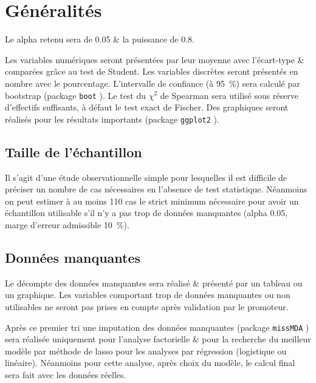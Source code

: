 \documentclass[
  a4paper,
  french]{scrreprt}
\renewcommand*\contentsname{Table des matières}
\newcommand\contentsname{Table des matières}
\begin{document}
\renewcommand*\contentsname{Table des matières}
{
\hypersetup{linkcolor=}
\setcounter{tocdepth}{2}
\tableofcontents
}
\chapter{Généralités}\label{guxe9nuxe9ralituxe9s}

Le \gls{alpha} retenu sera de \num{0.05} \& la \gls{puissance} de
\num{0.8}.

Les variables numériques seront présentées par leur moyenne avec
l'écart-type \& comparées grâce au test de Student. Les variables
discrètes seront présentés en nombre avec le pourcentage. L'intervalle
de confiance (à \qty{95}{\percent}) sera calculé par \gls{bootstrap}
(package \texttt{boot} \autocite{boot}). Le test du \(\chi^2\) de
Spearman sera utilisé sous réserve d'effectifs suffisants, à défaut le
test exact de Fischer. Des graphiques seront réalisés pour les résultats
importants (package \texttt{ggplot2} \autocite{ggplot}).

\section{Taille de l'échantillon}\label{taille-de-luxe9chantillon}

Il s'agit d'une étude observationnelle simple pour lesquelles il est
difficile de préciser un nombre de cas nécessaires en l'absence de test
statistique. Néanmoins on peut estimer à au moins 110 cas le strict
minimum nécessaire pour avoir un échantillon utilisable s'il n'y a pas
trop de données manquantes (\gls{alpha} \num{0.05}, marge d'erreur
admissible \qty{10}{\percent}).

\section{Données manquantes}\label{donnuxe9es-manquantes}

Le décompte des données manquantes sera réalisé \& présenté par un
tableau ou un graphique. Les variables comportant trop de données
manquantes ou non utilisables ne seront pas prises en compte après
validation par le promoteur.

Après ce premier tri une imputation des données manquantes (package
\texttt{missMDA} \autocite{missmda}) sera réalisée uniquement pour
l'analyse factorielle \& pour la recherche du meilleur modèle par
méthode de \gls{lasso} pour les analyses par régression (logistique ou
linéaire). Néanmoins pour cette analyse, après choix du modèle, le
calcul final sera fait avec les données réelles.
\end{document}
